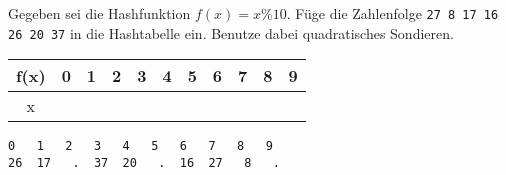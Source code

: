 
\renewcommand{\arraystretch}{2.0}
\setlength{\tabcolsep}{14pt}
\question[3]
Gegeben sei die Hashfunktion $f(x) = x \% 10$.
Füge die Zahlenfolge
\texttt{27 8 17 16 26 20 37}  in die Hashtabelle ein.
Benutze dabei quadratisches Sondieren.

\begin{tabular}{|c|c|c|c|c|c|c|c|c|c|c|}
\hline f(x) & 0 & 1 & 2 & 3 & 4 & 5 & 6 & 7 & 8 & 9 \\
\hline x     &   &    &    &   &   &    &    &   &   & \\
\hline
\end{tabular}

\ifprintanswers
\begin{solutionbox}{2cm}
\begin{lstlisting}
0   1   2   3   4   5   6   7   8   9
26  17   .  37  20   .  16  27   8   .
\end{lstlisting}
\end{solutionbox}
\fi
